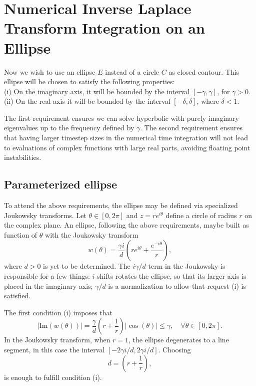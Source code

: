 \documentclass[10pt,a4paper,final]{article}
\begin{document}
\section{Numerical Inverse Laplace Transform Integration on an Ellipse}

Now we wish to use an ellipse $E $ instead of a circle $C $ as closed contour. This ellipse will be chosen to satisfy the following properties:\\
(i) On the imaginary axis, it will be bounded by the interval $[-\gamma, \gamma]$, for $\gamma >0$.\\
(ii) On the real axis it will be bounded by the interval $[-\delta, \delta]$, where $\delta < 1$.

The first requirement ensures we can solve hyperbolic with purely imaginary eigenvalues up to the frequency defined by $\gamma$. The second requirement ensures that having larger timestep sizes in the numerical time integration will not lead to evaluations of complex functions with large real parts, avoiding floating point instabilities.

\subsection{Parameterized ellipse}

To attend the above requirements, the ellipse may be defined via specialized Joukowsky transforms. Let $\theta \in [0,2\pi]$ and $z=re^{i\theta}$ define a circle of radius $r$ on the complex plane. An ellipse, following the above requirements, maybe built as function of $\theta$ with the Joukowsky transform
\begin{equation}
w(\theta)=\frac{\gamma i}{d}\left(re^{i\theta}+\frac{e^{-i\theta}}{r}\right),
\end{equation}
where $d>0$ is yet to be determined. The $i\gamma/d$ term in the Joukowsky is responsible for a few things: $i$ shifts rotates the ellipse, so that its larger axis is placed in the imaginary axis; $\gamma/d$ is a normalization to allow that request (i) is satisfied. 

The first condition (i) imposes that
\begin{equation}
|\text{Im}(w(\theta))|= \frac{\gamma }{d}\left(r+\frac{1}{r}\right)|\cos(\theta)| \leq \gamma, \quad \forall \theta \in [0, 2\pi].
\end{equation}
In the Joukowsky transform, when $r=1$, the ellipse degenerates to a line segment, in this case the interval $[-2\gamma i/d, 2\gamma i/d]$. Choosing 
\begin{equation}
d=\left(r+\frac{1}{r}\right),
\end{equation}
is enough to fulfill condition (i).
\end{document}
